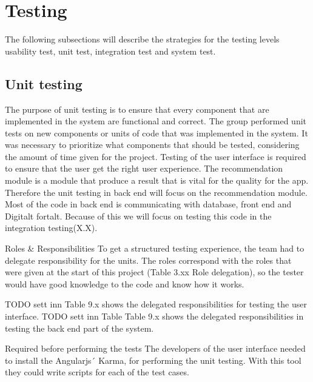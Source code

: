 
\chapter{Testing}

The following subsections will describe the strategies for the testing levels usability test, unit test, integration test and system test. 

\section{Unit testing}

The purpose of unit testing is to ensure that every component that are implemented in the system are functional and correct. The group performed unit tests on new components or units of code that was implemented in the system. It was necessary to prioritize what components that should be tested, considering the amount of time given for the project. Testing of the user interface is required to ensure that the user get the right user experience. The recommendation module is a module that produce a result that is vital for the quality for the app. Therefore the unit testing in back end will focus on the recommendation module. Most of the code in back end is communicating with database, front end and Digitalt fortalt. Because of this we will focus on testing this code in the integration testing(X.X).\newline

Roles \& Responsibilities\newline
To get a structured testing experience, the team had to delegate responsibility for the units. The roles correspond with the roles that were given at the start of this project (Table 3.xx Role delegation), so the tester would have good knowledge to the code and know how it works.  

TODO sett inn Table 9.x shows the delegated responsibilities for testing the user interface.\newline
TODO sett inn Table Table 9.x shows the delegated responsibilities in testing the back end part of the system.\newline

Required before performing the tests\newline
The developers of the user interface needed to install the Angularjs´ Karma, for performing the unit testing. With this tool they could write scripts for each of the test cases.\newline

